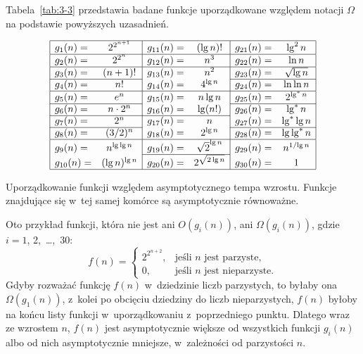 Tabela~\ref{tab:3-3} przedstawia badane funkcje uporządkowane względem notacji $\Omega$ na podstawie powyższych uzasadnień.
\begin{table}[ht]
	\begin{center}
		\[
			\begin{array}{|lc|lc|lc|} \hline
				g_1(n)= & 2^{2^{n+1}} & g_{11}(n)= & (\lg n)! & g_{21}(n)= & \lg^2n \\ \hline
				g_2(n)= & 2^{2^n} & g_{12}(n)= & n^3 & g_{22}(n)= & \ln n \\ \hline
				g_3(n)= & (n+1)! & g_{13}(n)= & n^2 & g_{23}(n)= & \sqrt{\lg n} \\ \cline{1-2}\cline{5-6}
				g_4(n)= & n! & g_{14}(n)= & 4^{\lg n} & g_{24}(n)= & \ln\ln n \\ \hline
				g_5(n)= & e^n & g_{15}(n)= & n\lg n & g_{25}(n)= & 2^{\lg^*n} \\ \cline{1-2}\cline{5-6}
				g_6(n)= & n\cdot2^n & g_{16}(n)= & \lg(n!) & g_{26}(n)= & \lg^*n \\ \cline{1-4}
				g_7(n)= & 2^n & g_{17}(n)= & n & g_{27}(n)= & \lg^*\lg n \\ \cline{1-2}\cline{5-6}
				g_8(n)= & (3/2)^n & g_{18}(n)= & 2^{\lg n} & g_{28}(n)= & \lg\lg^*n \\ \hline
				g_9(n)= & n^{\lg\lg n} & g_{19}(n)= & \sqrt{2}^{\lg n} & g_{29}(n)= & n^{1/\!\lg n} \\ \cline{3-4}
				g_{10}(n)= & (\lg n)^{\lg n} & g_{20}(n)= & 2^{\sqrt{2\lg n}} & g_{30}(n)= & 1 \\ \hline
			\end{array}
		\]
	\end{center}
	\caption{Uporządkowanie funkcji względem asymptotycznego tempa wzrostu. Funkcje znajdujące się w~tej samej komórce są asymptotycznie równoważne.} \label{tab:3-3}
\end{table}

\subproblem %
Oto przykład funkcji, która nie jest ani $O(g_i(n))$, ani $\Omega(g_i(n))$, gdzie $i=1$, 2,~\dots,~30:
\[
	f(n) =
	\begin{cases}
		2^{2^{n+2}}, & \text{jeśli $n$ jest parzyste,} \\
		0, & \text{jeśli $n$ jest nieparzyste}.
	\end{cases}
\]
Gdyby rozważać funkcję $f(n)$ w~dziedzinie liczb parzystych, to byłaby ona $\Omega(g_1(n))$, z~kolei po obcięciu dziedziny do liczb nieparzystych, $f(n)$ byłoby na końcu listy funkcji w~uporządkowaniu z~poprzedniego punktu. Dlatego wraz ze wzrostem $n$, $f(n)$ jest asymptotycznie większe od wszystkich funkcji $g_i(n)$ albo od nich asymptotycznie mniejsze, w~zależności od parzystości $n$.

